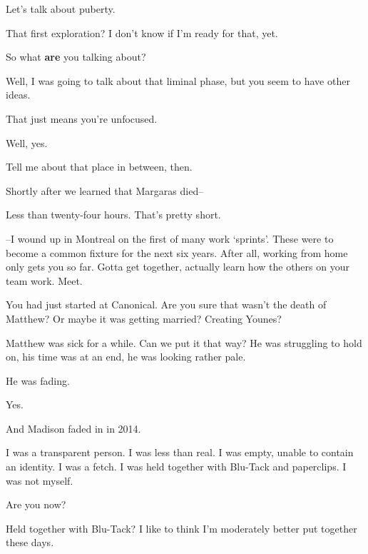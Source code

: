 \begin{paracol}{2}
\begin{leftcolumn}
\begin{ally}
Let's talk about puberty.
\end{ally}
That first exploration? I don't know if I'm ready for that, yet.

\begin{ally}
So what \textbf{are} you talking about?
\end{ally}
Well, I was going to talk about that liminal phase, but you seem to have other ideas.

\begin{ally}
That just means you're unfocused.
\end{ally}
Well, yes.

\begin{ally}
Tell me about that place in between, then.
\end{ally}
\newpage

\noindent Shortly after we learned that Margaras died--

\begin{ally}
Less than twenty-four hours. That's pretty short.
\end{ally}
--I wound up in Montreal on the first of many work `sprints'. These were to become a common fixture for the next six years. After all, working from home only gets you so far. Gotta get together, actually learn how the others on your team work. Meet.

\begin{ally}
You had just started at Canonical. Are you sure that wasn't the death of Matthew? Or maybe it was getting married? Creating Younes?
\end{ally}
Matthew was sick for a while. Can we put it that way? He was struggling to hold on, his time was at an end, he was looking rather pale.

\begin{ally}
He was fading.
\end{ally}
Yes.

\begin{ally}
And Madison faded in in 2014.
\end{ally}
I was a transparent person. I was less than real. I was empty, unable to contain an identity. I was a fetch. I was held together with Blu-Tack and paperclips. I was not myself.

\begin{ally}
Are you now?
\end{ally}
Held together with Blu-Tack? I like to think I'm moderately better put together these days.


\end{leftcolumn}
\end{paracol}
